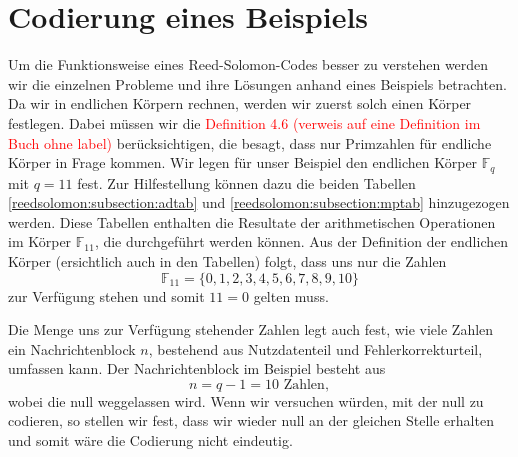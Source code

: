%
%
%
\section{Codierung eines Beispiels
\label{reedsolomon:section:codebsp}}

Um die Funktionsweise eines Reed-Solomon-Codes besser zu verstehen werden wir die einzelnen Probleme und ihre Lösungen anhand eines Beispiels betrachten.
Da wir in endlichen Körpern rechnen, werden wir zuerst solch einen Körper festlegen. Dabei müssen wir die \textcolor{red}{Definition 4.6 (verweis auf eine Definition im Buch ohne label)} berücksichtigen, die besagt, dass nur Primzahlen für endliche Körper in Frage kommen.
Wir legen für unser Beispiel den endlichen Körper $\mathbb{F}_{q}$ mit $q = 11$ fest.
Zur Hilfestellung können dazu die beiden Tabellen \ref{reedsolomon:subsection:adtab} und
\ref{reedsolomon:subsection:mptab} hinzugezogen werden. Diese Tabellen enthalten die Resultate der arithmetischen Operationen im Körper $\mathbb{F}_{11}$, die durchgeführt werden können.
Aus der Definition der endlichen Körper (ersichtlich auch in den Tabellen) folgt, dass uns nur die Zahlen \[\mathbb{F}_{11} = \{0,1,2,3,4,5,6,7,8,9,10\}\] zur Verfügung stehen und somit $11 = 0$ gelten muss.


%
%

Die Menge uns zur Verfügung stehender Zahlen legt auch fest, wie viele Zahlen ein Nachrichtenblock $n$, bestehend aus Nutzdatenteil und Fehlerkorrekturteil, umfassen kann.
Der Nachrichtenblock im Beispiel besteht aus
\[
n = q - 1 = 10 \text{ Zahlen},
\]
wobei die null weggelassen wird. Wenn wir versuchen würden, mit der null zu codieren, so stellen wir fest, dass wir wieder null an der gleichen Stelle erhalten und somit wäre die Codierung nicht eindeutig.



